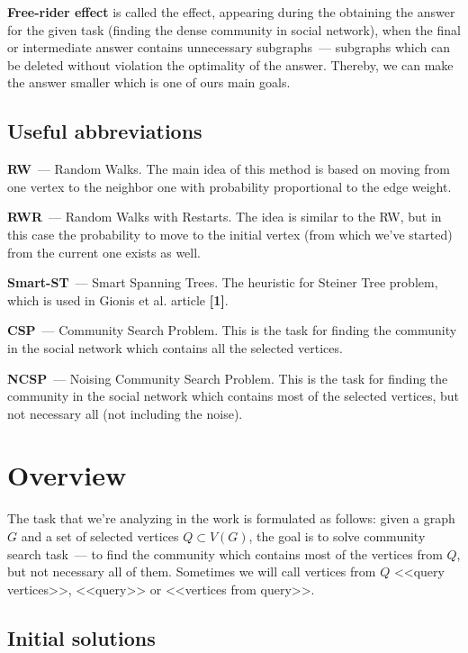 \documentclass[11pt,a4paper,oneside]{article}
\begin{document}
\textbf{Free-rider effect} is called the effect, appearing during the obtaining the answer for the given task (finding the dense community in social network), when the final or intermediate answer contains unnecessary subgraphs~--- subgraphs which can be deleted without violation the optimality of the answer. Thereby, we can make the answer smaller which is one of ours main goals.

\subsection{Useful abbreviations}

\textbf{RW}~--- Random Walks. The main idea of this method is based on moving from one vertex to the neighbor one with probability proportional to the edge weight.

\textbf{RWR}~--- Random Walks with Restarts. The idea is similar to the RW, but in this case the probability to move to the initial vertex (from which we've started) from the current one exists as well.

\textbf{Smart-ST}~--- Smart Spanning Trees. The heuristic for Steiner Tree problem, which is used in Gionis et al. article \textbf{[1]}.

\textbf{CSP}~--- Community Search Problem. This is the task for finding the community in the social network which contains all the selected vertices.

\textbf{NCSP}~--- Noising Community Search Problem. This is the task for finding the community in the social network which contains most of the selected vertices, but not necessary all (not including the noise).

\section{Overview}

The task that we're analyzing in the work is formulated as follows: given a graph $G$ and a set of selected vertices $Q \subset V(G)$, the goal is to solve community search task~--- to find the community which contains most of the vertices from $Q$, but not necessary all of them. Sometimes we will call vertices from $Q$ <<query vertices>>, <<query>> or <<vertices from query>>.

\subsection{Initial solutions}
\end{document}
